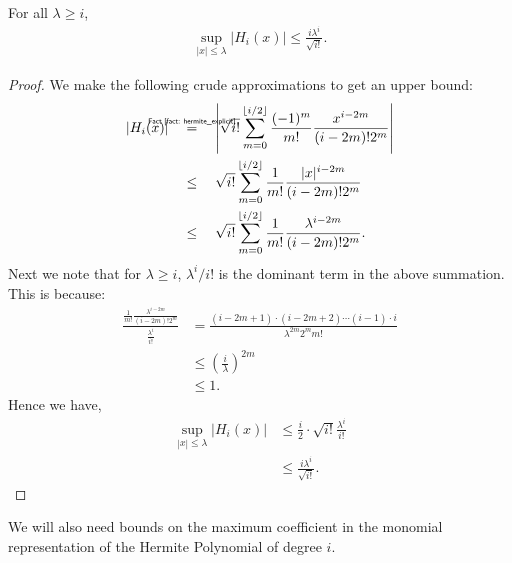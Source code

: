 \documentclass[final,12pt]{colt2018} %
\newcommand{\explain}[2]{\mathrel{\overset{\makebox[0pt]{\mbox{\normalfont\tiny\sffamily #1}}}{#2}}}
\begin{document}
\begin{lemma} For all $\lambda \geq i$,
\begin{align*}
    \sup_{|x| \leq \lambda} | H_i(x)| \leq \frac{i\lambda^i}{\sqrt{i!} }.
\end{align*}
\label{lemma: hermite_upperbound}
\end{lemma}
\begin{proof} We make the following crude approximations to get an upper bound: 
\begin{align*}
    |H_i(x)| & \quad \explain{Fact~\ref{fact: hermite_explicit}}{=} \quad \left| \sqrt{i!} \sum_{m=0}^{\lfloor i/2\rfloor} \frac{(-1)^m}{m!}\frac{x^{i-2m}}{(i-2m)! 2^m} \right| \\
    & \quad \leq \quad  \sqrt{i!} \sum_{m=0}^{\lfloor i/2\rfloor} \frac{1}{m!}\frac{|x|^{i-2m}}{(i-2m)! 2^m} \\
     & \quad \leq \quad \sqrt{i!} \sum_{m=0}^{\lfloor i/2\rfloor} \frac{1}{m!}\frac{\lambda^{i-2m}}{(i-2m)! 2^m}.
\end{align*}
Next we note that for $\lambda \geq i$, $\lambda^i/i!$ is the dominant term in the above summation. This is because: 
\begin{align*}
    \frac{\frac{1}{m!}\frac{\lambda^{i-2m}}{(i-2m)! 2^m}}{\frac{\lambda^i}{i!}} & = \frac{(i-2m+1) \cdot (i-2m + 2) \dotsb (i-1) \cdot i}{\lambda^{2m} 2^m m!} \\
    & \leq \left(\frac{i}{\lambda} \right)^{2m} \\
    & \leq 1.
\end{align*}
Hence we have,
\begin{align*}
    \sup_{|x| \leq \lambda} | H_i(x)| & \leq \frac{i}{2} \cdot  \sqrt{i!} \frac{\lambda^i}{i!} \\
    &\leq \frac{i\lambda^i}{\sqrt{i!}}.
\end{align*}
\end{proof}

We will also need bounds on the maximum coefficient in the monomial representation of the Hermite Polynomial of degree $i$. 
\end{document}
